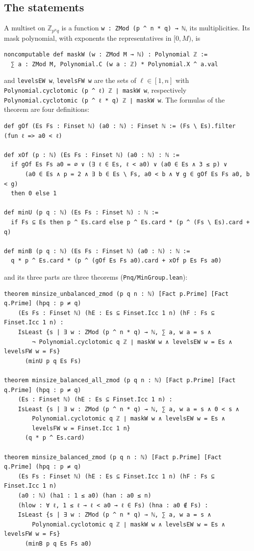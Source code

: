 \documentclass[11pt,a4paper]{amsart}
\theoremstyle{definition}
\theoremstyle{remark}
\newcommand{\Z}{\mathbb{Z}}
\newcommand{\lean}[1]{\texttt{#1}}
\begin{document}
\subsection*{The statements} A multiset on $\Z_{p^nq}$ is a function \lean{w : ZMod (p \^{} n * q) → ℕ}, its
multiplicities. Its mask polynomial, with exponents the representatives in $[0,M)$, is
{\footnotesize
\begin{verbatim}
noncomputable def maskW (w : ZMod M → ℕ) : Polynomial ℤ :=
  ∑ a : ZMod M, Polynomial.C (w a : ℤ) * Polynomial.X ^ a.val
\end{verbatim}
}
and \lean{levelsEW w}, \lean{levelsFW w} are the sets of $\ell\in[1,n]$ with
\lean{Polynomial.cyclotomic (p \^{} ℓ) ℤ ∣ maskW w}, respectively
\lean{Polynomial.cyclotomic (p \^{} ℓ * q) ℤ ∣ maskW w}. The formulas of the theorem are four definitions:
{\footnotesize
\begin{verbatim}
def gOf (Es Fs : Finset ℕ) (a0 : ℕ) : Finset ℕ := (Fs \ Es).filter (fun ℓ => a0 < ℓ)

def xOf (p : ℕ) (Es Fs : Finset ℕ) (a0 : ℕ) : ℕ :=
  if gOf Es Fs a0 = ∅ ∨ (∃ ℓ ∈ Es, ℓ < a0) ∨ (a0 ∈ Es ∧ 3 ≤ p) ∨
      (a0 ∈ Es ∧ p = 2 ∧ ∃ b ∈ Es \ Fs, a0 < b ∧ ∀ g ∈ gOf Es Fs a0, b < g)
  then 0 else 1

def minU (p q : ℕ) (Es Fs : Finset ℕ) : ℕ :=
  if Fs ⊆ Es then p ^ Es.card else p ^ Es.card * (p ^ (Fs \ Es).card + q)

def minB (p q : ℕ) (Es Fs : Finset ℕ) (a0 : ℕ) : ℕ :=
  q * p ^ Es.card * (p ^ (gOf Es Fs a0).card + xOf p Es Fs a0)
\end{verbatim}
}
and its three parts are three theorems (\lean{Pnq/MinGroup.lean}):
{\footnotesize
\begin{verbatim}
theorem minsize_unbalanced_zmod (p q n : ℕ) [Fact p.Prime] [Fact q.Prime] (hpq : p ≠ q)
    (Es Fs : Finset ℕ) (hE : Es ⊆ Finset.Icc 1 n) (hF : Fs ⊆ Finset.Icc 1 n) :
    IsLeast {s | ∃ w : ZMod (p ^ n * q) → ℕ, ∑ a, w a = s ∧
        ¬ Polynomial.cyclotomic q ℤ ∣ maskW w ∧ levelsEW w = Es ∧ levelsFW w = Fs}
      (minU p q Es Fs)

theorem minsize_balanced_all_zmod (p q n : ℕ) [Fact p.Prime] [Fact q.Prime] (hpq : p ≠ q)
    (Es : Finset ℕ) (hE : Es ⊆ Finset.Icc 1 n) :
    IsLeast {s | ∃ w : ZMod (p ^ n * q) → ℕ, ∑ a, w a = s ∧ 0 < s ∧
        Polynomial.cyclotomic q ℤ ∣ maskW w ∧ levelsEW w = Es ∧
        levelsFW w = Finset.Icc 1 n}
      (q * p ^ Es.card)

theorem minsize_balanced_zmod (p q n : ℕ) [Fact p.Prime] [Fact q.Prime] (hpq : p ≠ q)
    (Es Fs : Finset ℕ) (hE : Es ⊆ Finset.Icc 1 n) (hF : Fs ⊆ Finset.Icc 1 n)
    (a0 : ℕ) (ha1 : 1 ≤ a0) (han : a0 ≤ n)
    (hlow : ∀ ℓ, 1 ≤ ℓ → ℓ < a0 → ℓ ∈ Fs) (hna : a0 ∉ Fs) :
    IsLeast {s | ∃ w : ZMod (p ^ n * q) → ℕ, ∑ a, w a = s ∧
        Polynomial.cyclotomic q ℤ ∣ maskW w ∧ levelsEW w = Es ∧ levelsFW w = Fs}
      (minB p q Es Fs a0)
\end{verbatim}
}
\end{document}
